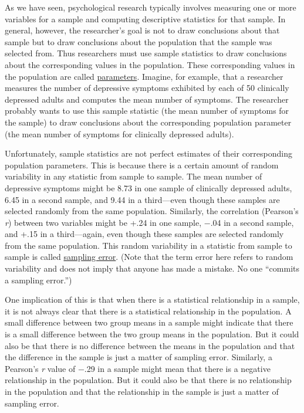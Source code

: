 \documentclass[
]{krantz}
\begin{document}
As we have seen, psychological research typically involves measuring one or more variables for a sample and computing descriptive statistics for that sample. In general, however, the researcher's goal is not to draw conclusions about that sample but to draw conclusions about the population that the sample was selected from. Thus researchers must use sample statistics to draw conclusions about the corresponding values in the population. These corresponding values in the population are called \protect\hyperlink{parameter}{parameters}. Imagine, for example, that a researcher measures the number of depressive symptoms exhibited by each of 50 clinically depressed adults and computes the mean number of symptoms. The researcher probably wants to use this sample statistic (the mean number of symptoms for the sample) to draw conclusions about the corresponding population parameter (the mean number of symptoms for clinically depressed adults).

Unfortunately, sample statistics are not perfect estimates of their corresponding population parameters. This is because there is a certain amount of random variability in any statistic from sample to sample. The mean number of depressive symptoms might be 8.73 in one sample of clinically depressed adults, 6.45 in a second sample, and 9.44 in a third---even though these samples are selected randomly from the same population. Similarly, the correlation (Pearson's \emph{r}) between two variables might be +.24 in one sample, −.04 in a second sample, and +.15 in a third---again, even though these samples are selected randomly from the same population. This random variability in a statistic from sample to sample is called \protect\hyperlink{sampling-error}{sampling error}. (Note that the term error here refers to random variability and does not imply that anyone has made a mistake. No one ``commits a sampling error.'')

One implication of this is that when there is a statistical relationship in a sample, it is not always clear that there is a statistical relationship in the population. A small difference between two group means in a sample might indicate that there is a small difference between the two group means in the population. But it could also be that there is no difference between the means in the population and that the difference in the sample is just a matter of sampling error. Similarly, a Pearson's \emph{r} value of −.29 in a sample might mean that there is a negative relationship in the population. But it could also be that there is no relationship in the population and that the relationship in the sample is just a matter of sampling error.
\end{document}
